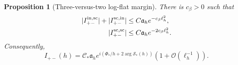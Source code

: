 \documentclass[11pt]{article}
\newtheorem{proposition}[theorem]{Proposition}
\newcommand{\cO}{\mathcal O}
\begin{document}
\begin{proposition}[Three-versus-two log-flat margin]
\label{prop:response-exclusion}
There is $c_\beta>0$ such that
\begin{align}
 |I_{+-}^{\rm in,sc}|+|I_{+-}^{\rm sc,in}|
 &\le C\mathfrak a_he^{-c_\beta\ell_h^2},
 \label{eq:mixed-response-small}\\
 |I_{+-}^{\rm sc,sc}|
 &\le C\mathfrak a_he^{-2c_\beta\ell_h^2}.
 \label{eq:double-response-small}
\end{align}
Consequently,
\begin{equation}\label{eq:exact-cross-asymptotic}
 I_{+-}(h)
 =\mathscr C_*\mathfrak a_h
 e^{i(\Phi_*/h+2\arg \mathcal S_*(h))}
 \left(1+\cO(\ell_h^{-1})\right).
\end{equation}
\end{proposition}
\end{document}
